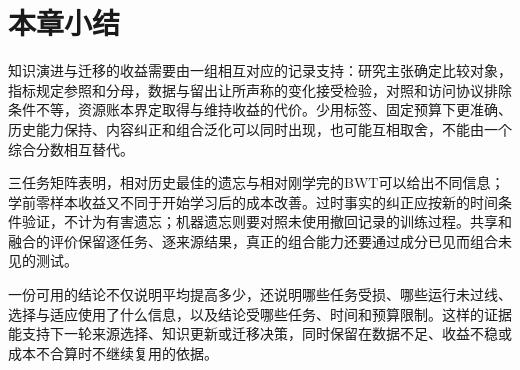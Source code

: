 \section{本章小结}
\label{sec:ket-evaluation-summary}

知识演进与迁移的收益需要由一组相互对应的记录支持：研究主张确定比较对象，指标规定参照和分母，数据与留出让所声称的变化接受检验，对照和访问协议排除条件不等，资源账本界定取得与维持收益的代价。少用标签、固定预算下更准确、历史能力保持、内容纠正和组合泛化可以同时出现，也可能互相取舍，不能由一个综合分数相互替代。

三任务矩阵表明，相对历史最佳的遗忘与相对刚学完的BWT可以给出不同信息；学前零样本收益又不同于开始学习后的成本改善。过时事实的纠正应按新的时间条件验证，不计为有害遗忘；机器遗忘则要对照未使用撤回记录的训练过程。共享和融合的评价保留逐任务、逐来源结果，真正的组合能力还要通过成分已见而组合未见的测试。

一份可用的结论不仅说明平均提高多少，还说明哪些任务受损、哪些运行未过线、选择与适应使用了什么信息，以及结论受哪些任务、时间和预算限制。这样的证据能支持下一轮来源选择、知识更新或迁移决策，同时保留在数据不足、收益不稳或成本不合算时不继续复用的依据。
